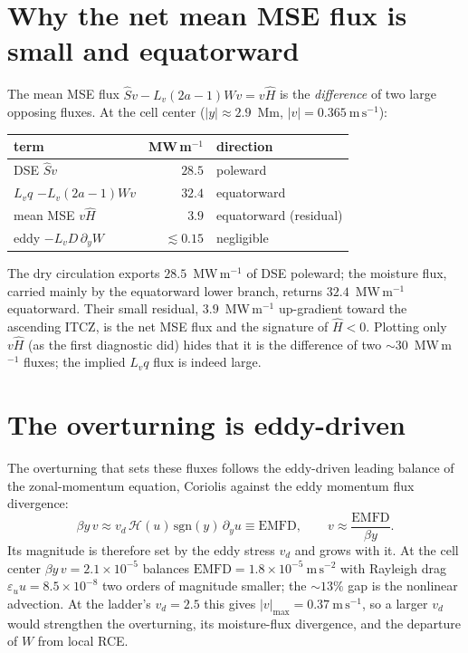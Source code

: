 \documentclass[11pt]{article}
\newcommand{\py}{\partial_y}
\newcommand{\Shat}{\hat S}
\newcommand{\Hhat}{\hat H}
\begin{document}
\section{Why the net mean MSE flux is small and equatorward}

The mean MSE flux $\Shat v - L_v(2a{-}1)Wv = v\Hhat$ is the \emph{difference} of two
large opposing fluxes. At the cell center ($|y|\approx2.9$~Mm, $|v|=0.365~\mathrm{m\,s^{-1}}$):

\begin{center}
\begin{tabular}{lrl}
\toprule
term & MW\,m$^{-1}$ & direction \\
\midrule
DSE $\Shat v$              & $28.5$ & poleward \\
$L_v q$ $-L_v(2a{-}1)Wv$   & $32.4$ & equatorward \\
\midrule
mean MSE $v\Hhat$          & $3.9$  & equatorward (residual) \\
eddy $-L_v D\,\py W$       & $\lesssim 0.15$ & negligible \\
\bottomrule
\end{tabular}
\end{center}

The dry circulation exports $28.5$~MW\,m$^{-1}$ of DSE poleward; the moisture flux,
carried mainly by the equatorward lower branch, returns $32.4$~MW\,m$^{-1}$
equatorward. Their small residual, $3.9$~MW\,m$^{-1}$ up-gradient toward the
ascending ITCZ, is the net MSE flux and the signature of $\Hhat<0$. Plotting only
$v\Hhat$ (as the first diagnostic did) hides that it is the difference of two
$\sim30$~MW\,m$^{-1}$ fluxes; the implied $L_v q$ flux is indeed large.

\section{The overturning is eddy-driven}

The overturning that sets these fluxes follows the eddy-driven leading balance of
the zonal-momentum equation, Coriolis against the eddy momentum flux divergence:
\begin{equation}
\beta y\,v \approx v_d\,\mathcal H(u)\,\mathrm{sgn}(y)\,\py u \equiv \text{EMFD},
\qquad
v \approx \frac{\text{EMFD}}{\beta y}.
\end{equation}
Its magnitude is therefore set by the eddy stress $v_d$ and grows with it. At the
cell center $\beta y\,v = 2.1\times10^{-5}$ balances
$\text{EMFD}=1.8\times10^{-5}~\mathrm{m\,s^{-2}}$ with Rayleigh drag
$\varepsilon_u u = 8.5\times10^{-8}$ two orders of magnitude smaller; the
$\sim13\%$ gap is the nonlinear advection. At the ladder's $v_d=2.5$ this gives
$|v|_{\max}=0.37~\mathrm{m\,s^{-1}}$, so a larger $v_d$ would strengthen the
overturning, its moisture-flux divergence, and the departure of $W$ from local
RCE.
\end{document}
